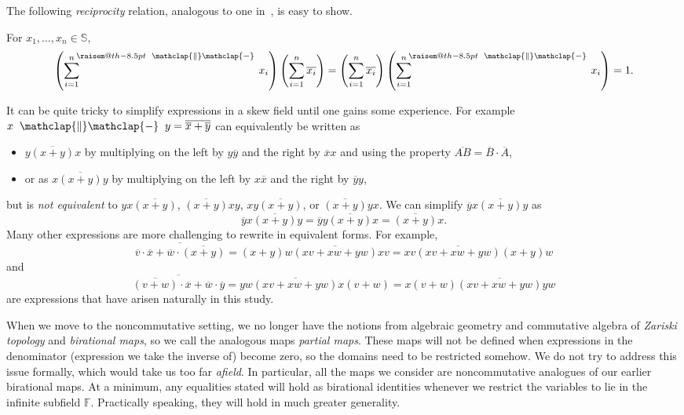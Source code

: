 \documentclass[ALCO,ThmDefs,Unicode,epreuves]{cedram}
\makeatletter
\newcommand{\defn}[1]{\emph{#1}}
\newcommand{\raisemath}[1]{\mathpalette{\raisem@th{#1}}}
\newcommand{\raisem@th}[3]{\raisebox{#1}{$#2#3$}}
\def\parallelsum{\:\ \mathclap{\|}\mathclap{-}\ \:}
\newcommand{\sumparlimits}[2]{{\sum\limits_{#1}^#2}^{\hspace{-3 pt}\raisemath{-8.5pt}{\parallelsum}}\hspace{-1.7pt}}
\newcommand{\qq}{\mathbb{Q}}
\newcommand{\ff}{\mathbb{F}}
\newcommand{\bbs}{\mathbb{S}}
\makeatother
\begin{document}
The following \defn{reciprocity} relation, analogous to one in~\cite[\S~5]{einpropp}, is easy to show.
\begin{prop}\label{prop:reciprocity}
For $x_1,\dots,x_n\in \bbs$,
\[
\left(\sumparlimits{i=1}{n} x_i\right)
\left(\sum\limits_{i=1}^n \overline{x_i}\right)=
\left(\sum\limits_{i=1}^n \overline{x_i}\right)
\left(\sumparlimits{i=1}{n} x_i\right) =1.
\]
\end{prop}


\begin{rema}
It can be quite tricky to simplify expressions in a skew field until one gains some
experience. 
For example $x\parallelsum y = \overline{\overline{x} + \overline{y}}$ can equivalently be written as
\begin{itemize}
 \item $y\overline{(x+y)}x$ by multiplying on the left by $y\overline{y}$ and the right by $\overline{x}x$
 and using the property $\overline{AB}=\overline{B}\cdot
 \overline{A}$,
 \item or as $x\overline{(x+y)}y$ by multiplying on the left by $x\overline{x}$ and the right by $\overline{y}y$,
\end{itemize}
but is \defn{not equivalent} to
$yx\overline{(x+y)}$, $\overline{(x+y)}xy$, $xy\overline{(x+y)}$, or $\overline{(x+y)}yx$.
We can simplify $\overline{y}x\overline{(x+y)}y$ as
\[
\overline{y}x\overline{(x+y)}y=
\overline{y}y\overline{(x+y)}x
=\overline{(x+y)}x.
\]
Many other expressions are more challenging to rewrite in equivalent forms. For example,
\[
\overline{\overline{v}\cdot\overline{x}+
\overline{w}\cdot\overline{(x+y)}}=
(x+y)w\overline{(xv+xw+yw)}xv=
xv\overline{(xv+xw+yw)}(x+y)w
\]
and
\[
\overline{\overline{(v+w)}\cdot\overline{x}+\overline{w}
\cdot\overline{y}}=yw\overline{(xv+xw+yw)}x(v+w)=
x(v+w)\overline{(xv+xw+yw)}yw
\]
are expressions that have arisen naturally in this study. 
\end{rema}
\begin{rema}\label{rem:partialMap}
When we move to the noncommutative setting, we no longer have the notions from algebraic
geometry and commutative 
algebra of \textit{Zariski
topology} and \textit{birational maps}, so we call the analogous maps \defn{partial maps}.
These maps will not be defined when 
expressions in the denominator (\ie expression we take the inverse of) become zero, so the domains need to be restricted somehow.
We do not try to address this issue formally, which would take us too far \emph{afield}. In
particular, all the maps we consider are noncommutative analogues of our earlier birational
maps. At a minimum, any equalities stated will hold as birational identities whenever we restrict the variables to lie
in the infinite subfield $\ff$. Practically speaking, they will hold in much greater generality.
\end{rema}
\end{document}

